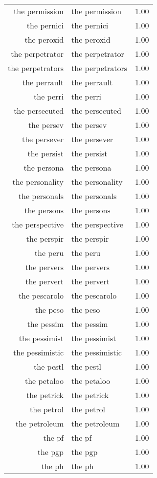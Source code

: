 \begin{table}[ht]
\begin{tabular}{rlr}
  the permission & the permission & 1.00 \\ 
  the pernici & the pernici & 1.00 \\ 
  the peroxid & the peroxid & 1.00 \\ 
  the perpetrator & the perpetrator & 1.00 \\ 
  the perpetrators & the perpetrators & 1.00 \\ 
  the perrault & the perrault & 1.00 \\ 
  the perri & the perri & 1.00 \\ 
  the persecuted & the persecuted & 1.00 \\ 
  the persev & the persev & 1.00 \\ 
  the persever & the persever & 1.00 \\ 
  the persist & the persist & 1.00 \\ 
  the persona & the persona & 1.00 \\ 
  the personality & the personality & 1.00 \\ 
  the personals & the personals & 1.00 \\ 
  the persons & the persons & 1.00 \\ 
  the perspective & the perspective & 1.00 \\ 
  the perspir & the perspir & 1.00 \\ 
  the peru & the peru & 1.00 \\ 
  the pervers & the pervers & 1.00 \\ 
  the pervert & the pervert & 1.00 \\ 
  the pescarolo & the pescarolo & 1.00 \\ 
  the peso & the peso & 1.00 \\ 
  the pessim & the pessim & 1.00 \\ 
  the pessimist & the pessimist & 1.00 \\ 
  the pessimistic & the pessimistic & 1.00 \\ 
  the pestl & the pestl & 1.00 \\ 
  the petaloo & the petaloo & 1.00 \\ 
  the petrick & the petrick & 1.00 \\ 
  the petrol & the petrol & 1.00 \\ 
  the petroleum & the petroleum & 1.00 \\ 
  the pf & the pf & 1.00 \\ 
  the pgp & the pgp & 1.00 \\ 
  the ph & the ph & 1.00 \\ 

\end{tabular}
\end{table}
